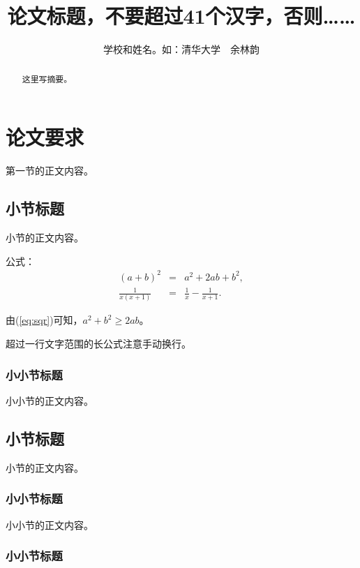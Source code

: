\documentclass{noithesis}
\begin{document}

\title{论文标题，不要超过41个汉字，否则……}
\author{学校和姓名。如：清华大学~~余林韵}

\maketitle

\begin{abstract}
这里写摘要。
\end{abstract}

\section{论文要求}

第一节的正文内容。

\subsection{小节标题}

小节的正文内容。

公式：
\begin{eqnarray}
\left(a+b\right)^2&=&a^2+2ab+b^2 \label{eq:sqr},\\
\frac{1}{x(x+1)}&=&\frac{1}{x}-\frac{1}{x+1}.
\end{eqnarray}

由(\ref{eq:sqr})可知，$a^2+b^2\geq 2ab$。

超过一行文字范围的长公式注意手动换行。

\subsubsection{小小节标题}

小小节的正文内容。

\subsection{小节标题}

小节的正文内容。

\subsubsection{小小节标题}

小小节的正文内容。

\subsubsection{小小节标题}
\end{document}
